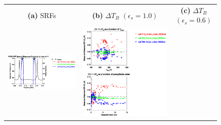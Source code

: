 \begin{figure}[H]
  \centering
  \begin{tabular}{c c c}
    \textsf{\textbf{(a)} SRFs} &
    \textsf{\textbf{(b)} $\Delta T_B$ $(\epsilon_s = 1.0)$} &
    \textsf{\textbf{(c)} $\Delta T_B$ $(\epsilon_s = 0.6)$} \\
    \includegraphics[bb=80 400 280 558,clip,scale=0.85]{graphics/srf/Tset/atms_npp.ch11.osrf.eps} &
    \includegraphics[bb=85 400 260 558,clip,scale=0.85]{graphics/dtb/Tset/e1.0_r0.0/atms_npp.ch11.dTb.eps} & 

\end{tabular}
\end{figure}

